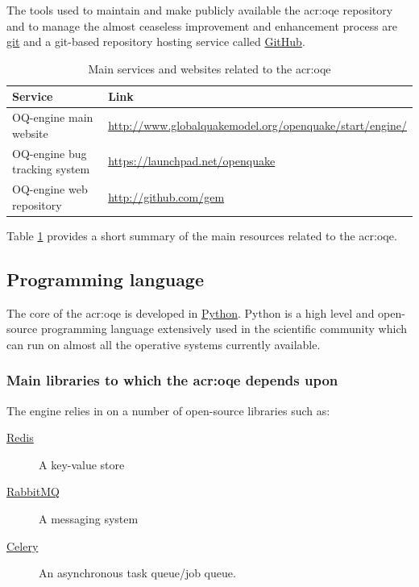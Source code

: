The tools used to maintain and make publicly available the \gls{acr:oqe} 
repository and to manage the almost ceaseless improvement and enhancement 
process are \href{http://git-scm.com/}{git} and a git-based repository 
hosting service called \href{http://github.com/}{GitHub}.
%
\begin{table}[!t]
\centering
\begin{tabular}{p{4cm}p{9cm}}
\hline
\rowcolor{anti-flashwhite}
\bf{Service} & \bf{Link}  \\
\hline 
OQ-engine main website & 
    \href{http://www.globalquakemodel.org/openquake/start/engine/}
        {http://www.globalquakemodel.org/openquake/start/engine/} \\
OQ-engine bug tracking system & 
    \href{https://launchpad.net/openquake}{https://launchpad.net/openquake} \\
OQ-engine web repository & 
    \href{http://github.com/gem}{http://github.com/gem} \\
\hline
\end{tabular}
\label{tab:development_tools}
\caption{Main services and websites related to the \gls{acr:oqe}}
\end{table}
Table \ref{tab:development_tools} provides a short summary of the main 
resources related to the \gls{acr:oqe}.
%
\subsection{Programming language}
The core of the \gls{acr:oqe} is developed in 
\href{https://www.python.org/}{Python}. Python is a high level and open-source
programming language extensively used in the scientific community 
which can run on almost all the operative systems currently available.
%
\subsubsection{Main libraries to which the \gls{acr:oqe} depends upon}
The engine relies in on a number of open-source libraries such as:
\begin{description}
    \item [\href{http://redis.io/}{Redis}] A key-value store
    \item [\href{https://www.rabbitmq.com/}{RabbitMQ}] A messaging system
    \item [\href{http://www.celeryproject.org/}{Celery}] An asynchronous 
        task queue/job queue.
\end{description}
%
